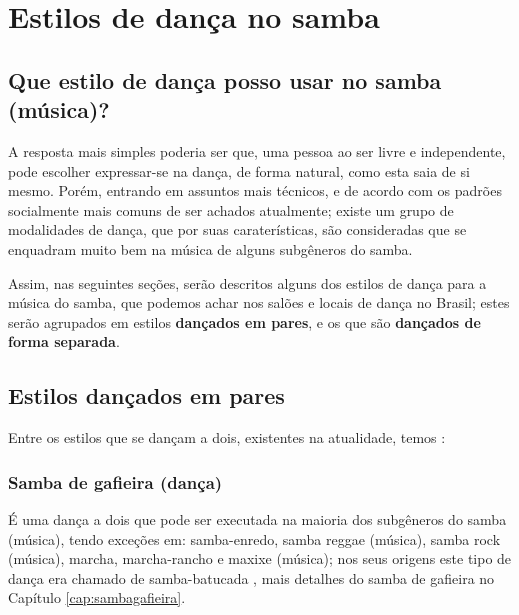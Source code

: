 
\chapter{Estilos de dança no samba}

\section{Que estilo de dança posso usar no samba (música)?}
\label{subsec:estilosdedanca}
A resposta mais simples poderia ser que, uma pessoa ao ser livre e independente,
pode escolher expressar-se na dança, de forma natural, como esta saia de si mesmo.
Porém, entrando em assuntos mais técnicos, 
e de acordo com os padrões socialmente mais comuns de ser achados atualmente;
existe um grupo de modalidades de dança, que por suas caraterísticas, 
são consideradas que se enquadram muito bem na música de alguns subgêneros do samba.

Assim, nas seguintes seções, serão descritos alguns dos estilos de dança para a música do samba,  
que podemos achar nos salões e locais de dança no Brasil;
estes serão agrupados em estilos \textbf{dançados em pares}, e os que são \textbf{dançados de forma separada}. 


\section{Estilos dançados em pares}
\label{subsec:estilosdedancapares}
Entre os estilos que se dançam a dois, existentes na atualidade, temos \cite[pp. 134]{perna2002samba}:

\subsection{Samba de gafieira (dança)} 
É uma dança a dois que pode ser executada na maioria dos subgêneros do samba (música),
tendo exceções em: samba-enredo, samba reggae (música), samba rock (música), 
marcha, marcha-rancho e maxixe (música);
nos seus origens este tipo de dança era chamado de samba-batucada  \cite[pp. 134]{perna2002samba}, 
mais detalhes do samba de gafieira no Capítulo \ref{cap:sambagafieira}.

